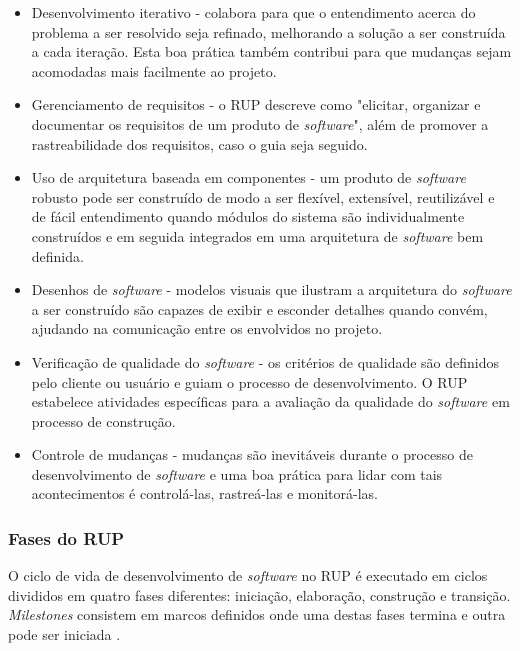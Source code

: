\begin{itemize}
\item Desenvolvimento iterativo - colabora para que o entendimento acerca do problema a ser resolvido seja refinado, melhorando a solução a ser construída a cada iteração. Esta boa prática também contribui para que mudanças sejam acomodadas mais facilmente ao projeto.

\item Gerenciamento de requisitos - o RUP descreve como "elicitar, organizar e documentar os requisitos de um produto de \textit{software}", além de promover a rastreabilidade dos requisitos, caso o guia seja seguido.

\item Uso de arquitetura baseada em componentes - um produto de \textit{software} robusto pode ser construído de modo a ser flexível, extensível, reutilizável e de fácil entendimento quando módulos do sistema são individualmente construídos e em seguida integrados em uma arquitetura de \textit{software} bem definida.

\item Desenhos de \textit{software} - modelos visuais que ilustram a arquitetura  do \textit{software} a ser construído são capazes de exibir e esconder detalhes quando convém, ajudando na comunicação entre os envolvidos no projeto.

\item Verificação de qualidade do \textit{software} - os critérios de qualidade são definidos pelo cliente ou usuário e guiam o processo de desenvolvimento. O RUP estabelece atividades específicas para a avaliação da qualidade do \textit{software} em processo de construção.

\item Controle de mudanças - mudanças são inevitáveis durante o processo de desenvolvimento de \textit{software} e uma boa prática para lidar com tais acontecimentos é controlá-las, rastreá-las e monitorá-las. 
\end{itemize}

\subsubsection{Fases do RUP}
O ciclo de vida de desenvolvimento de \textit{software} no RUP é executado em ciclos divididos em quatro fases diferentes: iniciação, elaboração, construção e transição. \textit{Milestones} consistem em marcos definidos onde uma destas fases termina e outra pode ser iniciada \cite{rational_software_rational_1998}. 

